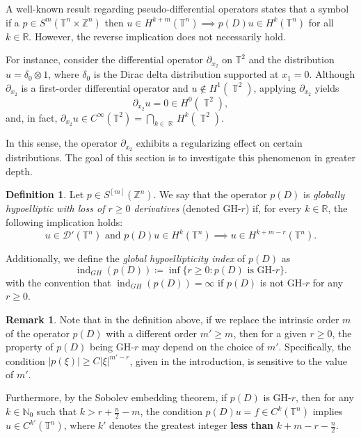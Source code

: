 \documentclass[11pt]{amsart}
\numberwithin{equation}{section}
\theoremstyle{definition}
\newtheorem{definition}[theorem]{Definition}
\newtheorem{remark}[theorem]{Remark}
\DeclareMathOperator{\R}{\mathbb{R}}
\DeclareMathOperator{\Z}{\mathbb{Z}}
\DeclareMathOperator{\T}{\mathbb{T}}
\begin{document}
	A well-known result regarding pseudo-differential operators states that a symbol if a \( p \in S^{m}(\mathbb{T}^n \times \mathbb{Z}^n) \) then \( u \in H^{k+m}(\mathbb{T}^n) \implies  p(D)u \in H^k(\mathbb{T}^n) \) for all \( k \in \mathbb{R} \).  However, the reverse implication does not necessarily hold. 
	
	For instance, consider the differential operator \( \partial_{x_2} \) on \( \mathbb{T}^2 \) and the distribution \( u = \delta_0 \otimes 1 \), where \( \delta_0 \) is the Dirac delta distribution supported at \( x_1 = 0 \).  Although \( \partial_{x_2} \) is a first-order differential operator and \( u \notin  H^{1}(\T^2) \), applying \( \partial_{x_2} \) yields
	\begin{equation*}
		\partial_{x_2} u = 0 \in H^{0}(\T^2),
	\end{equation*}
	and, in fact, \( \partial_{x_2} u \in C^\infty(\mathbb{T}^2)=\bigcap_{k\in\R}H^{k}(\T^2) \).
	
	In this sense, the operator \( \partial_{x_2} \) exhibits a regularizing effect on certain distributions. The goal of this section is to investigate this phenomenon in greater depth.

	\begin{definition}
		Let \( p \in S^{[m]}(\mathbb{Z}^n) \). We say that the operator \( p(D) \) is \textit{globally hypoelliptic with loss of \( r \geq 0 \) derivatives} (denoted GH-\( r \)) if, for every \( k \in \mathbb{R} \), the following implication holds:
		\[
		u \in \mathscr{D}'(\mathbb{T}^n) \text{ and } p(D)u \in H^k(\mathbb{T}^n) \implies u \in H^{k + m - r}(\mathbb{T}^n).
		\]
		
		Additionally, we define the \textit{global hypoellipticity index} of \( p(D) \) as
		\[
		\operatorname{ind}_{GH}(p(D)) \coloneqq \inf\{r \geq 0 : p(D) \text{ is GH-}r\}.
		\]
		with the convention that \( \operatorname{ind}_{GH}(p(D)) = \infty \) if \( p(D) \) is not GH-\( r \) for any \( r \geq 0 \).
	\end{definition}
   
	\begin{remark}
		Note that in the definition above, if we replace the intrinsic order \( m \) of the operator \( p(D) \) with a different order \( m'  \geq m \), then for a given \( r \geq 0 \), the property of \( p(D) \) being GH-\( r \) may depend on the choice of \( m' \). Specifically, the condition \( |p(\xi)| \geq C |\xi|^{m' - r} \), given in the introduction, is sensitive to the value of \( m' \).
		
		Furthermore, by the Sobolev embedding theorem, if \( p(D) \) is GH-\( r \), then for any \( k \in \mathbb{N}_0 \) such that \( k > r+\frac{n}{2}-m \), the condition \( p(D)u = f \in C^k(\mathbb{T}^n) \) implies \( u \in C^{k'}(\mathbb{T}^n) \), where $k'$ denotes the greatest integer {\bf less than} $k+m-r-\frac{n}{2}$.  
        
	\end{remark}
	
\end{document}

